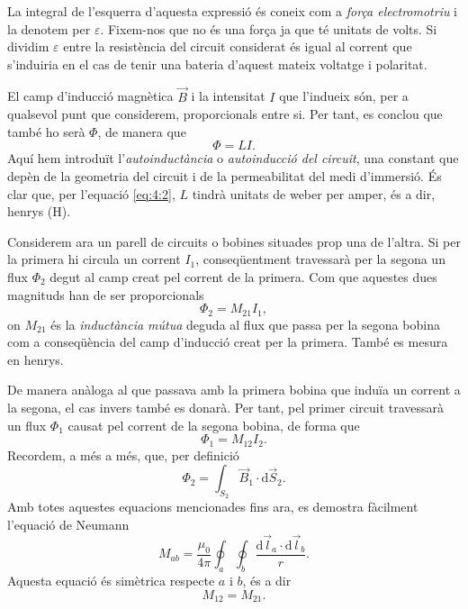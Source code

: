 \documentclass[a4paper,10.5pt]{report}
\begin{document}
La integral de l'esquerra d'aquesta expressió és coneix com a \textit{força electromotriu} i la denotem per $\varepsilon$. Fixem-nos que no és una força ja que té unitats de volts. Si dividim $\varepsilon$ entre la resistència del circuit considerat és igual al corrent que s'induiria en el cas de tenir una bateria d'aquest mateix voltatge i polaritat.

El camp d'inducció magnètica $\Vec{B}$ i la intensitat $I$ que l'indueix són, per a qualsevol punt que considerem, proporcionals entre si. Per tant, es conclou que també ho serà $\Phi$, de manera que
\begin{equation}
	\Phi=LI \label{eq:4:2}.
\end{equation}
Aquí hem introduït l'\textit{autoinductància} o \textit{autoinducció del circuit}, una constant que depèn de la geometria del circuit i de la permeabilitat del medi d'immersió. És clar que, per l'equació \eqref{eq:4:2}, $L$ tindrà unitats de weber per amper, és a dir, henrys (H).

Considerem ara un parell de circuits o bobines situades prop una de l'altra. Si per la primera hi circula un corrent $I_1$, conseqüentment travessarà per la segona un flux $\Phi_2$ degut al camp creat pel corrent de la primera. Com que aquestes dues magnituds han de ser proporcionals
\begin{equation}
	\Phi_2=M_{21}I_1 \label{eq:4:3},
\end{equation}
on $M_{21}$ és la \textit{inductància mútua} deguda al flux que passa per la segona bobina com a conseqüència del camp d'inducció creat per la primera. També es mesura en henrys. 

De manera anàloga al que passava amb la primera bobina que induïa un corrent a la segona, el cas invers també es donarà. Per tant, pel primer circuit travessarà un flux $\Phi_1$ causat pel corrent de la segona bobina, de forma que
\begin{equation}
	\Phi_1=M_{12}I_2 \label{eq:4:4}.
\end{equation}
Recordem, a més a més, que, per definició
\begin{equation}
	\Phi_2=\int_{S_2}\vec{B}_1 \cdot \mathrm{d}\Vec{S}_2 \label{eq:4:5}.
\end{equation}
Amb totes aquestes equacions mencionades fins ara, es demostra fàcilment l'equació de Neumann
\begin{equation}
	M_{ab}=\frac{\mu_0}{4\pi}\oint_a\oint_b\frac{\mathrm{d}\Vec{l}_a\cdot\mathrm{d}\Vec{l}_b}{r} \label{eq:4:6}.
\end{equation}
Aquesta equació és simètrica respecte $a$ i $b$, és a dir
\begin{equation}
	M_{12}=M_{21}. \label{eq:4:7}
\end{equation}
\end{document}

